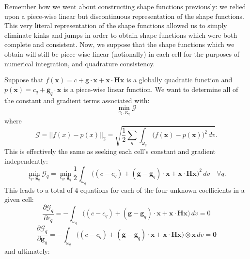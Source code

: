 \documentclass[11pt]{article} %
\begin{document}
Remember how we went about constructing shape functions previously: we relied upon a piece-wise linear but discontinuous representation of the shape functions. This very literal representation of the shape functions allowed us to simply eliminate kinks and jumps in order to obtain shape functions which were both complete and consistent. Now, we suppose that the shape functions which we obtain will still be piece-wise linear (notionally) in each cell for the purposes of numerical integration, and quadrature consistency. 

Suppose that $f(\mathbf{x}) = c + \mathbf{g} \cdot \mathbf{x} + \mathbf{x} \cdot \mathbf{H} \mathbf{x}$ is a globally quadratic function and $p(\mathbf{x}) = c_q + \mathbf{g}_q \cdot \mathbf{x}$ is a piece-wise linear function. We want to determine all of the constant and gradient terms associated with:
\begin{equation}
	\min_{c_q, \, \mathbf{g}_q} \mathcal{G}
\end{equation}
where
\begin{equation}
	\mathcal{G} = || f(x) - p(x) ||_2 = \sqrt{\frac{1}{2} \sum_q \int_{\omega_q} \big( f(\mathbf{x}) - p(\mathbf{x}) \big)^2 \, dv} .
\end{equation}
This is effectively the same as seeking each cell's constant and gradient independently:
\begin{equation}
	\min_{c_q, \, \mathbf{g}_q} \mathcal{G}_q = \min_{c_q, \, \mathbf{g}_q} \frac{1}{2} \int_{\omega_q} \big( (c - c_q) + (\mathbf{g} - \mathbf{g}_q ) \cdot \mathbf{x} + \mathbf{x} \cdot \mathbf{H} \mathbf{x} \big)^2 \, dv \quad \forall q.
\end{equation}
This leads to a total of 4 equations for each of the four unknown coefficients in a given cell:
\begin{equation}
	\frac{\partial \mathcal{G}_q}{\partial c_q} = - \int_{\omega_q} \big( (c - c_q) + (\mathbf{g} - \mathbf{g}_q ) \cdot \mathbf{x} + \mathbf{x} \cdot \mathbf{H} \mathbf{x} \big) \, dv = 0
\end{equation}
\begin{equation}
	\frac{\partial \mathcal{G}_q}{\partial \mathbf{g}_q} = - \int_{\omega_q} \big( (c - c_q) + (\mathbf{g} - \mathbf{g}_q ) \cdot \mathbf{x} + \mathbf{x} \cdot \mathbf{H} \mathbf{x} \big) \otimes \mathbf{x} \, dv = \mathbf{0}
\end{equation}
and ultimately:
\end{document}
